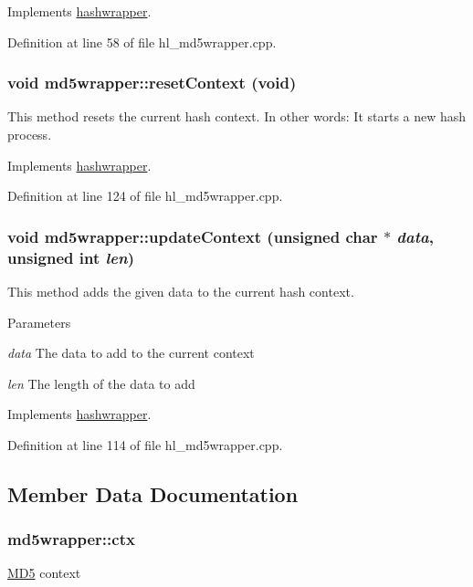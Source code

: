Implements \hyperlink{classhashwrapper_a53f97c06885ed2b1fa255759a957a782}{hashwrapper}.

Definition at line 58 of file hl\_\-md5wrapper.cpp.\hypertarget{classmd5wrapper_a1e96064bfbb4156962d419f87ad684aa}{
\subsubsection[{resetContext}]{\setlength{\rightskip}{0pt plus 5cm}void md5wrapper::resetContext (void)}}
\label{classmd5wrapper_a1e96064bfbb4156962d419f87ad684aa}


This method resets the current hash context. In other words: It starts a new hash process. 

Implements \hyperlink{classhashwrapper_aa7d46e9630a794ff08cfb5307660a86d}{hashwrapper}.

Definition at line 124 of file hl\_\-md5wrapper.cpp.\hypertarget{classmd5wrapper_a6ab84182cd32d43f5fd05bfb68bbc133}{
\subsubsection[{updateContext}]{\setlength{\rightskip}{0pt plus 5cm}void md5wrapper::updateContext (unsigned char $\ast$ {\em data}, \/  unsigned int {\em len})}}
\label{classmd5wrapper_a6ab84182cd32d43f5fd05bfb68bbc133}


This method adds the given data to the current hash context. 
\begin{DoxyParams}{Parameters}
\item[{\em data}]The data to add to the current context \item[{\em len}]The length of the data to add \end{DoxyParams}


Implements \hyperlink{classhashwrapper_a7fe42ccf310e7d2cfe95f61732b73197}{hashwrapper}.

Definition at line 114 of file hl\_\-md5wrapper.cpp.

\subsection{Member Data Documentation}
\hypertarget{classmd5wrapper_a00cf50f92e684cdaf85f6a5c1d1ac2dd}{
\subsubsection[{ctx}]{ {\bf md5wrapper::ctx}}}
\label{classmd5wrapper_a00cf50f92e684cdaf85f6a5c1d1ac2dd}
\hyperlink{class_m_d5}{MD5} context 


